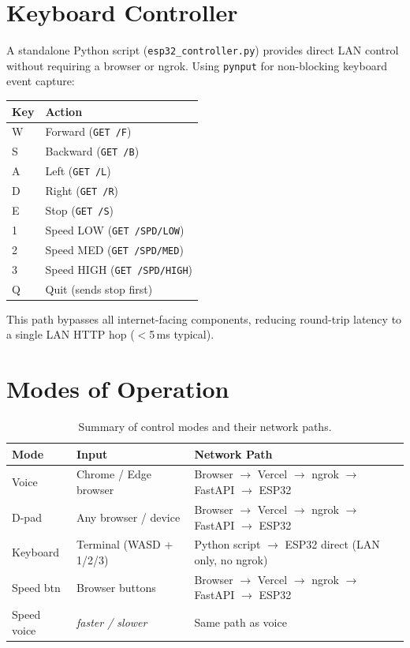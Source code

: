 \documentclass[12pt]{report}
\begin{document}
\section{Keyboard Controller}

A standalone Python script (\texttt{esp32\_controller.py}) provides direct LAN
control without requiring a browser or ngrok. Using \texttt{pynput} for
non-blocking keyboard event capture:

\begin{center}
\begin{tabular}{ll}
    \toprule
    \textbf{Key} & \textbf{Action} \\
    \midrule
    W & Forward (\texttt{GET /F}) \\
    S & Backward (\texttt{GET /B}) \\
    A & Left (\texttt{GET /L}) \\
    D & Right (\texttt{GET /R}) \\
    E & Stop (\texttt{GET /S}) \\
    1 & Speed LOW (\texttt{GET /SPD/LOW}) \\
    2 & Speed MED (\texttt{GET /SPD/MED}) \\
    3 & Speed HIGH (\texttt{GET /SPD/HIGH}) \\
    Q & Quit (sends stop first) \\
    \bottomrule
\end{tabular}
\end{center}

This path bypasses all internet-facing components, reducing round-trip latency
to a single LAN HTTP hop ($<$5\,ms typical).

\section{Modes of Operation}

\begin{table}[H]
    \centering
    \renewcommand{\arraystretch}{1.2}
    \begin{tabular}{p{2.2cm}p{2.8cm}p{7cm}}
        \toprule
        \textbf{Mode} & \textbf{Input} & \textbf{Network Path} \\
        \midrule
        Voice      & Chrome / Edge browser
                   & Browser $\to$ Vercel $\to$ ngrok $\to$ FastAPI $\to$ ESP32 \\
        D-pad      & Any browser / device
                   & Browser $\to$ Vercel $\to$ ngrok $\to$ FastAPI $\to$ ESP32 \\
        Keyboard   & Terminal (WASD + 1/2/3)
                   & Python script $\to$ ESP32 direct (LAN only, no ngrok) \\
        Speed btn  & Browser buttons
                   & Browser $\to$ Vercel $\to$ ngrok $\to$ FastAPI $\to$ ESP32 \\
        Speed voice& \textit{faster / slower}
                   & Same path as voice \\
        \bottomrule
    \end{tabular}
    \caption{Summary of control modes and their network paths.}
    \label{tab:modes}
\end{table}
\end{document}
